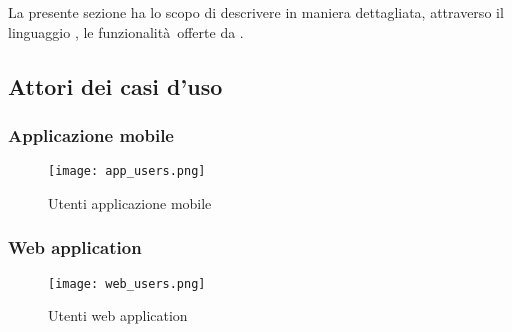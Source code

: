 \documentclass[../analisi-dei-requisiti.tex]{subfiles}
\begin{document}
La presente sezione ha lo scopo di descrivere in maniera dettagliata, attraverso il linguaggio , le funzionalità offerte da .

\subsection{Attori dei casi d'uso}%
\label{sub:attori_casi_duso}

\subsubsection{Applicazione mobile}%
\label{subs:mobile_app}

\begin{figure}[H]
  \centering
  \texttt{[image: app\_users.png]}
  \caption{Utenti applicazione mobile}%
  \label{fig:usersapp}
\end{figure}

\subsubsection{Web application}%
\label{subs:web_application}

\begin{figure}[H]
  \centering
  \texttt{[image: web\_users.png]}
  \caption{Utenti web application}%
  \label{fig:usersweb}
\end{figure}
\end{document}
